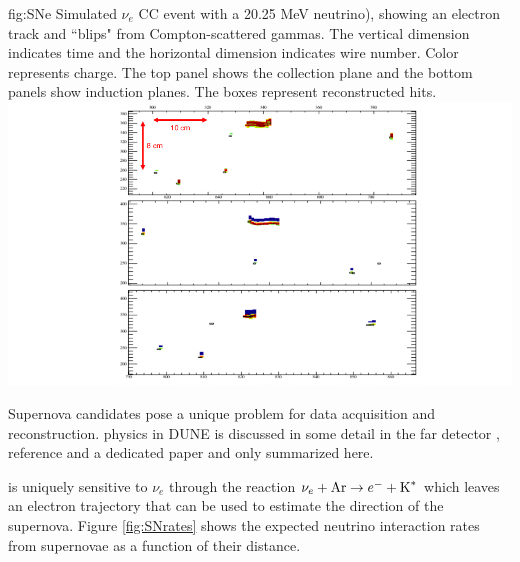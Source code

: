 \documentclass[../main-v1.tex]{subfiles}
\begin{document}
\begin{dunefigure}
{fig:SNe} %
{
 Simulated $\nu_e$
 CC event with a 20.25 MeV neutrino), showing an electron track and ``blips" from Compton-scattered gammas. The vertical dimension indicates time and the horizontal dimension indicates wire number. Color represents charge. The top panel shows the collection plane and the bottom panels show induction planes. The boxes represent reconstructed hits. }
\includegraphics[width=\textwidth]{graphics/IntroFigures/nueCC_20-25MeV_event25_2.png} %
\end{dunefigure}



Supernova candidates pose a unique problem for data acquisition and reconstruction.   physics in DUNE is discussed in some detail in the far detector \cite{ Abi:2020evt}, reference \cite{Cuesta:2020dyj} and a dedicated paper \cite{DUNE:2020zfm} and only summarized here. 

 is uniquely sensitive to $\nu_e$ through the reaction $\nu_e + \hbox{Ar} \rightarrow e^- + \hbox{K}^*$ which leaves an electron trajectory that can be used to estimate the direction of the supernova.  Figure \ref{fig:SNrates} shows the expected neutrino interaction rates from supernovae as a function of their distance.

\end{document}
